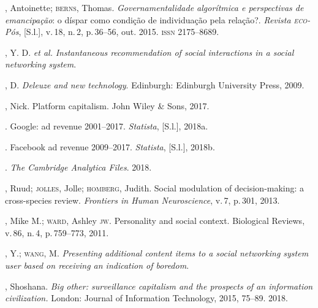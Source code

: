 \begin{bibliohedra}
, Antoinette; \textsc{berns}, Thomas. \textit{Governamentalidade
algorítmica e perspectivas de emancipação}: o díspar como condição de
individuação pela relação?. \textit{Revista \textsc{eco}-Pós}, {[}S.l.{]}, v.\,18,
n.\,2, p.\,36--56, out. 2015. \textsc{issn} 2175--8689. 


, Y. D. \textit{et al.} \textit{Instantaneous recommendation of
social interactions in a social networking system}. 


, D. \textit{Deleuze and new technology}. Edinburgh: Edinburgh
University Press, 2009.

, Nick. Platform capitalism. John Wiley \& Sons, 2017.

. Google: ad revenue 2001--2017. \textit{Statista}, {[}S.l.{]},
2018a. 


\titidem. Facebook ad revenue 2009--2017. \textit{Statista},
{[}S.l.{]}, 2018b. 


. \textit{The Cambridge Analytica Files}. 2018. 


, Ruud; \textsc{jolles}, Jolle; \textsc{homberg}, Judith. Social modulation of
decision-making: a cross-species review. \textit{Frontiers in Human
Neuroscience}, v.\,7, p.\,301, 2013.

, Mike M.; \textsc{ward}, Ashley \textsc{jw}. Personality and social context.
Biological Reviews, v.\,86, n.\,4, p.\,759--773, 2011.

, Y.; \textsc{wang}, M. \textit{Presenting additional content items to a social
networking system user based on receiving an indication of boredom}.

, Shoshana. \textit{Big other: surveillance capitalism and the
prospects of an information civilization.} London: Journal of
Information Technology, 2015, 75--89. 2018.
\end{bibliohedra}



